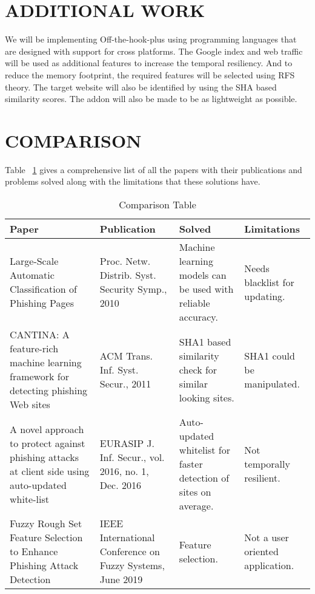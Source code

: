 \section{ADDITIONAL WORK}
We will be implementing Off-the-hook-plus using programming languages that are designed with support for cross platforms. The Google index and web traffic will be used as additional features to increase the temporal resiliency. And to reduce the memory footprint, the required features will be selected using RFS theory. The target website will also be identified by using the SHA based similarity scores. The addon will also be made to be as lightweight as possible.

\section{COMPARISON}
Table ~\ref{tab:ct} gives a comprehensive list of all the papers with their publications and problems solved along with the limitations that these solutions have.

\begin{table}[h!]
\centering
    \begin{tabular}{ |m{3cm}|m{3cm}|m{4cm}|m{4cm}| }
    \hline
    Paper & Publication & Solved & Limitations \\ \hline
    Large-Scale Automatic Classification of Phishing Pages & Proc. Netw. Distrib. Syst. Security Symp., 2010 & Machine learning models can be used with reliable accuracy. & Needs blacklist for updating. \\ \hline
    CANTINA: A feature-rich machine learning framework for detecting phishing Web sites & ACM Trans. Inf. Syst. Secur., 2011 & SHA1 based similarity check for similar looking sites. & SHA1 could be manipulated. \\ \hline
    A novel approach to protect against phishing attacks at client side using auto-updated white-list & EURASIP J. Inf. Secur., vol. 2016, no. 1, Dec. 2016 & Auto-updated whitelist for faster detection of sites on average. & Not temporally resilient. \\ \hline
    Fuzzy Rough Set Feature Selection to Enhance Phishing Attack Detection & IEEE International Conference on Fuzzy Systems, June 2019 & Feature selection. & Not a user oriented application. \\ \hline
    \end{tabular}
\caption{Comparison Table}
\label{tab:ct}
\end{table}